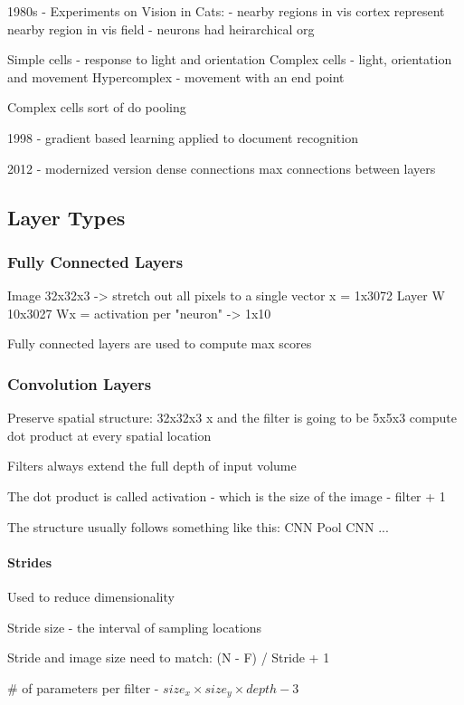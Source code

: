  1980s - Experiments on Vision in Cats: 
 - nearby regions in vis cortex represent nearby region in vis field
 - neurons had heirarchical org 

Simple cells - response to light and orientation 
Complex cells - light, orientation and movement 
Hypercomplex - movement with an end point

Complex cells sort of do pooling

1998 - gradient based learning applied to document recognition

2012 - modernized version
dense connections 
max connections between layers

\subsection{Layer Types}

\subsubsection{Fully Connected Layers}

Image 32x32x3 -> stretch out all pixels to a single vector x = 1x3072 
Layer W 10x3027
Wx = activation per "neuron" -> 1x10

Fully connected layers are used to compute max scores

\subsubsection{Convolution Layers}
Preserve spatial structure: 
32x32x3 x 
and the filter is going to be 5x5x3 
compute dot product at every spatial location

Filters always extend the full depth of input volume

The dot product is called activation - which is the size of the image - filter + 1

The structure usually follows something like this:
CNN
Pool
CNN
...

\paragraph{Strides}

Used to reduce dimensionality

Stride size - the interval of sampling locations

Stride and image size need to match: (N - F) / Stride + 1 

\# of parameters per filter - $size_x \times size_y \times depth - 3$

